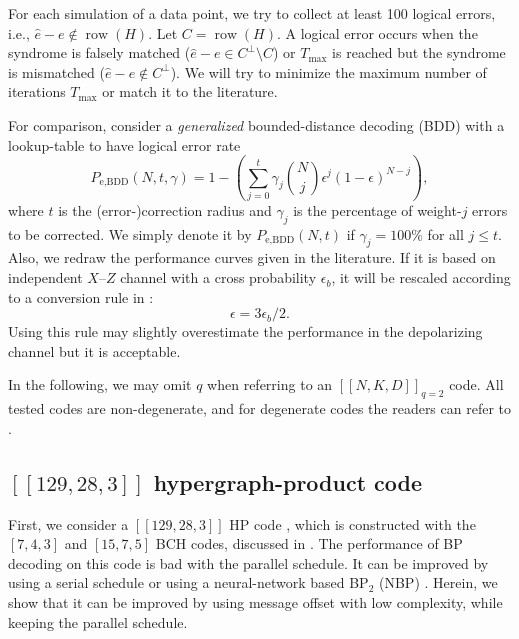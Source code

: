 \documentclass{ieeeaccess}
\DeclareMathOperator{\row}{row}
\let\emph\textit
\theoremstyle{definition}		%
\begin{document}
For each simulation of a data point, we try to collect at least 100 logical errors, i.e., $\hat e - e \notin \row(H)$. 
%
Let $C = \row(H)$. 
A logical error occurs when the syndrome is falsely matched (${ \hat e - e \in C^\perp\setminus C }$) 
or $T_{\max}$ is reached but the syndrome is mismatched (${ \hat e - e \notin C^\perp }$).
%
We will try to minimize the maximum number of iterations $T_{\max}$ or match it to the literature.



For comparison, consider a \emph{generalized} bounded-distance decoding (BDD) with a lookup-table to have logical error rate
%
	\begin{equation} \label{eq:BDD}
	P_\text{e,BDD}(N,t,\gamma) = 1- \textstyle \left(\sum_{j=0}^t \gamma_j\binom{N}{j} \epsilon^j (1-\epsilon)^{N-j} \right),
	\end{equation}
%
where $t$ is the (error-)correction radius and $\gamma_j$ is the percentage of weight-$j$ errors to be corrected.
We  simply denote it by $P_\text{e,BDD}(N,t)$ if ${\gamma_j=100\%}$ for all $j\le t$.
Also, we  redraw the performance curves given in the literature. 
If it is based on independent $X$--$Z$ channel with a cross probability $\epsilon_b$, 
it will be rescaled according to a conversion rule in \cite{MMM04}:
%
	\begin{equation} \label{eq:b2e}
	\epsilon = 3\epsilon_b/2. 
	\end{equation}
%
Using this rule may slightly overestimate the performance in the depolarizing channel but it is acceptable.
%

In the following, we may omit $q$ when referring to an $ [[N,K,D]]_{q=2} $ code.
All tested codes are non-degenerate, and for degenerate codes the readers can refer to \cite{KL21}.



\subsection{$[[129,28,3]]$ hypergraph-product  code} \label{sec:sim_129}
First, we consider a $[[129,28,3]]$ HP code \cite{TZ14}, which is constructed with the $[7,4,3]$ and $[15,7,5]$ BCH codes, discussed in \cite{LP19,KL20,KCL21}.
The performance of BP decoding on this code  is bad  with the parallel schedule.
It can be improved by using a serial schedule \cite{KL20,KCL21} or using a neural-network based BP$_2$ (NBP) \cite{LP19}.
%
Herein, we show that it can be improved by using message offset with  low complexity, while keeping the parallel schedule.
\end{document}
